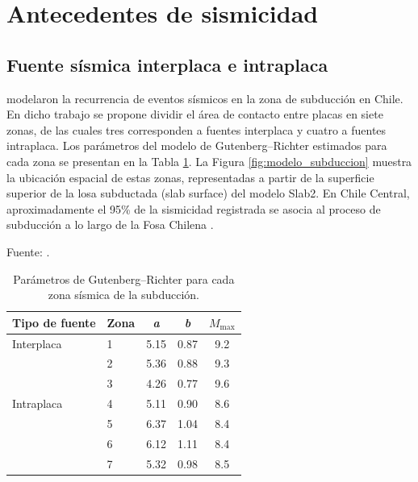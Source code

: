 \section{Antecedentes de sismicidad}

\subsection{Fuente sísmica interplaca e intraplaca}

 modelaron la recurrencia de eventos sísmicos en la zona de subducción en Chile. En dicho trabajo se propone dividir el área de contacto entre placas en siete zonas, de las cuales tres corresponden a fuentes interplaca y cuatro a fuentes intraplaca. Los parámetros del modelo de Gutenberg--Richter estimados para cada zona se presentan en la Tabla \ref{tab:parametros_GR}. La Figura \ref{fig:modelo_subduccion} muestra la ubicación espacial de estas zonas, representadas a partir de la superficie superior de la losa subductada (slab surface) del modelo Slab2. En Chile Central, aproximadamente el 95\% de la sismicidad registrada se asocia al proceso de subducción a lo largo de la Fosa Chilena .

\begin{table}[H]
\centering
\caption{Parámetros de Gutenberg--Richter para cada zona sísmica de la subducción.}
{\footnotesize Fuente: .\par}
\small
\begin{tabular}{@{}llccc@{}}
\toprule
\textbf{Tipo de fuente} & \textbf{Zona} & \textbf{\textit{a}} & \textbf{\textit{b}} & \(M_{\text{max}}\) \\
\midrule
Interplaca              & 1             & 5.15                & 0.87                & 9.2                        \\
                        & 2             & 5.36                & 0.88                & 9.3                        \\
                        & 3             & 4.26                & 0.77                & 9.6                        \\
Intraplaca              & 4             & 5.11                & 0.90                & 8.6                        \\
                        & 5             & 6.37                & 1.04                & 8.4                        \\
                        & 6             & 6.12                & 1.11                & 8.4                        \\
                        & 7             & 5.32                & 0.98                & 8.5                        \\
\bottomrule
\end{tabular}
\label{tab:parametros_GR}
\end{table}

